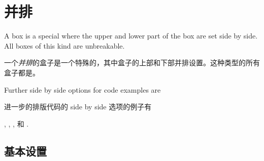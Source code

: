 
\setcounter{section}{5}
\setcounter{subsection}{2}

\section{并排}\label{sec:sidebyside}%
%

A  box is a special  where
the upper and lower part of the box are set side by side.
All boxes of this kind are unbreakable.


一个\emph{并排}的盒子是一个特殊的，其中盒子的上部和下部并排设置。这种类型的所有盒子都是。


\begin{marker}
Further side by side options for code examples are

进一步的排版代码的 side by side 选项的例子有

,
,
, 和
.
\end{marker}

\subsection{基本设置}\label{subsec:sidebyside_basic}

%
%
%

 

